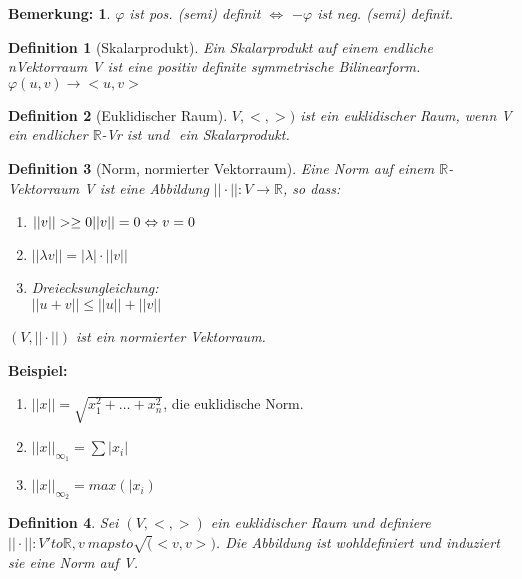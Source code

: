 \documentclass{report}
\newcommand{\lb}{\lambda}
\newcommand{\R}{\mathbb{R}}
\newcommand{\mR}{\(\mathbb{R}\)}
\newenvironment{beispiel} {
\textbf{Beispiel:}\hfill\break
}{}
\theoremstyle{customrem}
\newtheorem*{bemerkung}{Bemerkung\textnormal:}
\theoremstyle{customdef}
\newtheorem{definition}{Definition}[chapter]
\theoremstyle{customenv}
\begin{document}
\begin{bemerkung}
  \(\varphi\) ist pos. (semi) definit \(\Leftrightarrow\) \(-\varphi\)
  ist neg. (semi) definit.
\end{bemerkung}

\begin{definition}[Skalarprodukt]
  Ein Skalarprodukt auf einem endliche nVektorraum V ist eine positiv definite
  symmetrische Bilinearform.
  \(\varphi(u, v) \to <u, v>\)
\end{definition}

\begin{definition}[Euklidischer Raum]
  \(V, <, >)\) ist ein euklidischer Raum, wenn V ein endlicher \(\R\)-Vr ist
  und \(<, >\) ein Skalarprodukt.
\end{definition}

\begin{definition}[Norm, normierter Vektorraum]
  Eine Norm auf einem \mR-Vektorraum V ist eine Abbildung
  \(||\cdot|| : V \to \R\), so dass:
  \begin{enumerate}
    \item {
        \(||v|| >\ge 0\\
        ||v|| = 0 \Leftrightarrow v = 0\)
    }
    \item {
      \(||\lb v|| = |\lb| \cdot ||v||\)
    }
    \item {
      Dreiecksungleichung:\\
      \(|| u + v|| \le ||u|| + ||v||\)
    }
  \end{enumerate}
  \((V, ||\cdot||)\) ist ein normierter Vektorraum.
\end{definition}

\begin{beispiel}
  \begin{enumerate}
    \item {
      \(||x|| = \sqrt{x_1^2 + \dots + x_n^2}\), die euklidische Norm. 
    }
    \item {
      \(||x||_{\infty_1} = \sum |x_i|\)
    }
    \item {
      \(||x||_{\infty_2} = max(|x_i)\)
    }
  \end{enumerate}
\end{beispiel}

\begin{definition}
  Sei \((V, <, >)\) ein euklidischer Raum und definiere
  \(||\cdot|| : V 'to \R, v\ mapsto \sqrt(<v, v>)\). Die Abbildung ist
  wohldefiniert und induziert sie eine Norm auf V.
\end{definition}
\end{document}
